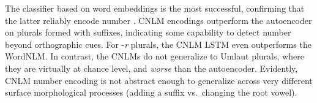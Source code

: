 


The classifier based on word embeddings is the most successful,
confirming that the latter reliably encode number
\cite{Mikolov:etal:2013a}.  CNLM encodings outperform the autoencoder
on plurals formed with suffixes, indicating some capability to detect
number beyond orthographic cues.  For -\emph{r} plurals, the CNLM LSTM
even outperforms the WordNLM.  In contrast, the CNLMs do not
generalize to Umlaut plurals, where they are virtually at chance level,
and \emph{worse} than the autoencoder. Evidently, CNLM number encoding
is not abstract enough to generalize across very different surface
morphological processes (adding a suffix vs.~changing the root vowel).
